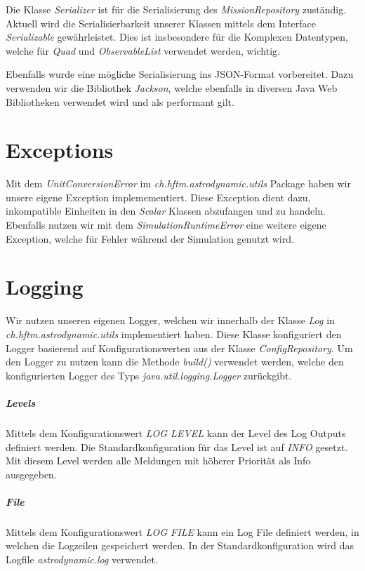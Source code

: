 Die Klasse \textit{Serializer} ist für die Serialisierung des \textit{MissionRepository} zuständig.
Aktuell wird die Serialisierbarkeit unserer Klassen mittels dem Interface \textit{Serializable} gewährleistet.
Dies ist insbesondere für die Komplexen Datentypen, welche für \textit{Quad} und \textit{ObservableList} verwendet werden, wichtig.

Ebenfalls wurde eine mögliche Serialisierung ins JSON-Format vorbereitet. Dazu verwenden wir die Bibliothek \textit{Jackson}, welche ebenfalls in diversen Java Web Bibliotheken verwendet wird und als performant gilt.

\section{Exceptions}

Mit dem \textit{UnitConversionError} im \textit{ch.hftm.astrodynamic.utils} Package haben wir unsere eigene Exception implemementiert.
Diese Exception dient dazu, inkompatible Einheiten in den \textit{Scalar} Klassen abzufangen und zu handeln.
Ebenfalls nutzen wir mit dem \textit{SimulationRuntimeError} eine weitere eigene Exception, welche für Fehler während der Simulation genutzt wird.

\section{Logging}

Wir nutzen unseren eigenen Logger, welchen wir innerhalb der Klasse \textit{Log} in \textit{ch.hftm.astrodynamic.utils} implementiert haben.
Diese Klasse konfiguriert den Logger basierend auf Konfigurationswerten aus der Klasse \textit{ConfigRepository}.
Um den Logger zu nutzen kann die Methode \textit{build()} verwendet werden, welche den konfigurierten Logger des Typs \textit{java.util.logging.Logger} zurückgibt.

\subparagraph{Levels}

Mittels dem Konfigurationswert \textit{LOG LEVEL} kann der Level des Log Outputs definiert werden.
Die Standardkonfiguration für das Level ist auf \textit{INFO} gesetzt. Mit diesem Level werden alle Meldungen mit höherer Priorität als Info ausgegeben. 

\subparagraph{File}

Mittels dem Konfigurationswert \textit{LOG FILE} kann ein Log File definiert werden, in welchen die Logzeilen gespeichert werden.
In der Standardkonfiguration wird das Logfile \textit{astrodynamic.log} verwendet.

